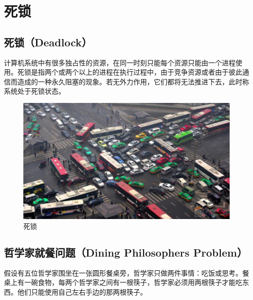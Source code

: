\newpage

\section{死锁}

\subsection{死锁（Deadlock）}

计算机系统中有很多独占性的资源，在同一时刻只能每个资源只能由一个进程使用。死锁是指两个或两个以上的进程在执行过程中，由于竞争资源或者由于彼此通信而造成的一种永久阻塞的现象。若无外力作用，它们都将无法推进下去，此时称系统处于死锁状态。

\begin{figure}[H]
    \centering
    \includegraphics[scale=0.9]{img/C2/2-8/1.png}
    \caption{死锁}
\end{figure}

\vspace{0.5cm}

\subsection{哲学家就餐问题（Dining Philosophers Problem）}

假设有五位哲学家围坐在一张圆形餐桌旁，哲学家只做两件事情：吃饭或思考。餐桌上有一碗食物，每两个哲学家之间有一根筷子，哲学家必须用两根筷子才能吃东西。他们只能使用自己左右手边的那两根筷子。


